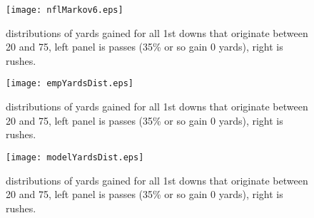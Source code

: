 \documentclass{article}
\begin{document}
\begin{figure} [!ht] 
\begin{center}
\texttt{[image: nflMarkov6.eps]}
\end{center}
\caption{
distributions of yards gained for all 1st downs that originate between 20 and 75, left panel is passes (35\% or so gain 0 yards), right is rushes.
 }
\label{fignm6}
\end{figure}

\begin{figure} [!ht] 
\begin{center}
\texttt{[image: empYardsDist.eps]}
\end{center}
\caption{
distributions of yards gained for all 1st downs that originate between 20 and 75, left panel is passes (35\% or so gain 0 yards), right is rushes.
 }
\label{figye1}
\end{figure}

\begin{figure} [!ht] 
\begin{center}
\texttt{[image: modelYardsDist.eps]}
\end{center}
\caption{
distributions of yards gained for all 1st downs that originate between 20 and 75, left panel is passes (35\% or so gain 0 yards), right is rushes.
 }
\label{figym1}
\end{figure}
\end{document}
